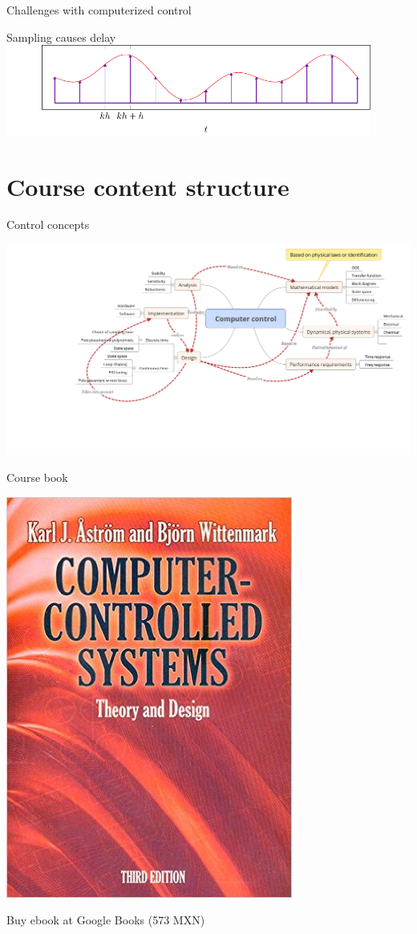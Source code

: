 \documentclass[presentation,aspectratio=169]{beamer}
\begin{document}
\begin{frame}[label=sec-4-5]{Challenges with computerized control}
\begin{block}{Sampling causes delay}
\includegraphics[width=0.9\textwidth]{../../figures/modulation-model-timeseries}
\end{block}
\end{frame}


\section{Course content structure}
\label{sec-5}

\begin{frame}[label=sec-5-1]{Control concepts}
\begin{center}
\includegraphics[width=1.1\linewidth]{../../figures/computercontrol.png}
\end{center}
\end{frame}
\begin{frame}[label=sec-5-2]{Course book}
\begin{center}
\includegraphics[width=0.2\linewidth]{../../figures/book.png}
\end{center}
Buy ebook at Google Books (573 MXN)
\end{frame}
\end{document}
